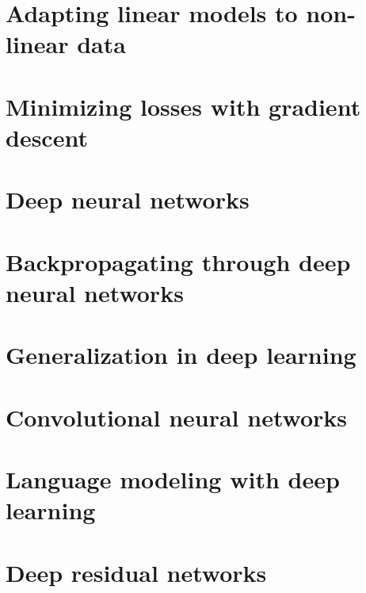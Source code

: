 \documentclass{article}
\begin{document}
\section{Adapting linear models to non-linear data}

\section{Minimizing losses with gradient descent}

\section{Deep neural networks}

\section{Backpropagating through deep neural networks}

\section{Generalization in deep learning}

\section{Convolutional neural networks}

\section{Language modeling with deep learning}

\section{Deep residual networks}
\end{document}
